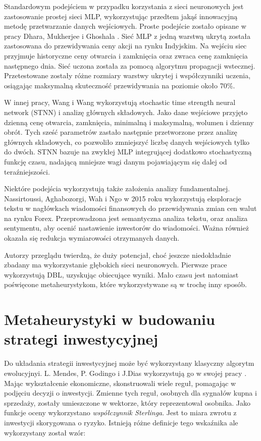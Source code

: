 \documentclass[twoside]{iisthesis}
\begin{document}
Standardowym podejściem w przypadku korzystania z sieci neuronowych jest zastosowanie prostej sieci MLP, wykorzystując przedtem jakąś innowacyjną metodę przetwarzanie danych wejściowych. Proste podejście zostało opisane w pracy Dhara, Mukherjee i Ghoshala \cite{5738795}. Sieć MLP z jedną warstwą ukrytą została zastosowana do przewidywania ceny akcji na rynku Indyjskim. Na wejściu siec przyjmuje historyczne ceny otwarcia i zamknięcia oraz zwraca cenę zamknięcia następnego dnia. Sieć uczona została za pomocą algorytmu propagacji wstecznej. Przetestowane zostały różne rozmiary warstwy ukrytej i współczynniki uczenia, osiągając maksymalną skuteczność przewidywania na poziomie około 70\%. 

W innej pracy, Wang i Wang wykorzystują stochastic time strength neural network (STNN) i analizę głównych składowych. Jako dane wejściowe przyjęto dzienną cenę otwarcia, zamknięcia, minimalną i maksymalną, wolumen i dzienny obrót. Tych sześć parametrów zastało następnie przetworzone przez analizę głównych składowych, co pozwoliło zmniejszyć liczbę danych wejściowych tylko do dwóch. STNN bazuje na zwykłej MLP integrującej dodatkowo stochastyczną funkcję czasu, nadającą mniejsze wagi danym pojawiającym się dalej od teraźniejszości.

Niektóre podejścia wykorzystują także założenia analizy fundamentalnej. Nassirtoussi, Aghabozorgi, Wah i Ngo w 2015 roku \cite{KhadjehNassirtoussi2015306} wykorzystują eksploracje tekstu w nagłówkach wiadomości finansowych do przewidywania zmian cen walut na rynku Forex. Przeprowadzona jest semantyczna analiza tekstu, oraz analiza sentymentu, aby ocenić nastawienie inwestorów do wiadomości. Ważna również okazała się redukcja wymiarowości otrzymanych danych.

Autorzy przeglądu \cite{Cavalcante2016194} twierdzą, że duży potencjał, choć jeszcze niedokładnie zbadany ma wykorzystanie głębokich sieci neuronowych. Pierwsze prace wykorzystują DBL, uzyskując obiecujące wyniki. Mało czasu jest natomiast poświęcone metaheurystykom, które wykorzystywane są w trochę inny sposób.





\section{Metaheurystyki w budowaniu strategi inwestycyjnej}

Do układania strategii inwestycyjnej może być wykorzystany klasyczny algorytm ewolucyjnyi. L. Mendes, P. Godingo i J.Dias wykorzystują go w swojej pracy \cite{Mendes2012}. Mając wykształcenie ekonomiczne, skonstruowali wiele reguł, pomagając w podjęciu decyzji o inwestycji. Zmienne tych reguł, osobnych dla sygnałów kupna i sprzedaży, zostały umieszczone w wektorze, który reprezentował osobnika. Jako funkcje oceny wykorzystano \textit{współczynnik Sterlinga}. Jest to miara zwrotu z inwestycji skorygowana o ryzyko. Istnieją różne definicje tego wskaźnika ale wykorzystany został wzór:
\end{document}
